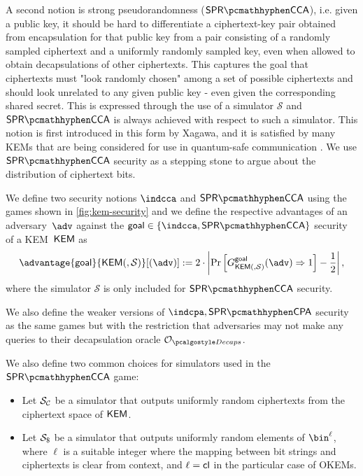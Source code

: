 A second notion is strong pseudorandomness ($\sprcca$), i.e. given a public key, it should be hard to differentiate a ciphertext-key pair obtained from encapsulation for that public key from a pair consisting of a randomly sampled ciphertext and a uniformly randomly sampled key, even when allowed to obtain decapsulations of other ciphertexts.
This captures the goal that ciphertexts must "look randomly chosen" among a set of possible ciphertexts and should look unrelated to any given public key - even given the corresponding shared secret.
This is expressed through the use of a simulator $\mathcal S$ and $\sprcca$ is always achieved with respect to such a simulator.
This notion is first introduced \cite{EC:Xagawa22} in this form by Xagawa, and it is satisfied by many KEMs that are being considered for use in quantum-safe communication \cite{EC:Xagawa22}. We use $\sprcca$ security as a stepping stone to argue about the distribution of ciphertext bits.

\begin{definition} \label{def:kem-security}
    We define two security notions $\indcca$ and $\sprcca$ using the games shown in \cref{fig:kem-security} and we define the respective advantages of an adversary~$\adv$ against the $\mathsf{goal} \in \{\indcca, \sprcca\}$ security of a KEM~$\mathsf{KEM}$ as
    \[
        \advantage{\mathsf{goal}}{\KEM(, \mathcal{S})}[(\adv)] := 2 \cdot \left| \Pr \left[ G^{\mathsf{goal}}_{\KEM(, \mathcal{S})}(\adv) \Rightarrow 1 \right] - \frac{1}{2} \right|,
    \]
    where the simulator $\mathcal{S}$ is only included for $\sprcca$ security.

    We also define the weaker versions of $\indcpa,\sprcpa$ security as the same games but with the restriction that adversaries may not make any queries to their decapsulation oracle $\decapsoracle$.

    We also define two common choices for simulators used in the $\sprcca$ game:
    \begin{itemize}
        \item Let $\mathcal{S}_\mathcal{C}$ be a simulator that outputs uniformly random ciphertexts from the ciphertext space of $\mathsf{KEM}$.
        \item Let $\simulbin$ be a simulator that outputs uniformly random elements of $\bin^\ell$, where $\ell$ is a suitable integer where the mapping between bit strings and ciphertexts is clear from context, and $\ell = \mathsf{cl}$ in the particular case of OKEMs.
    \end{itemize}
\end{definition}

